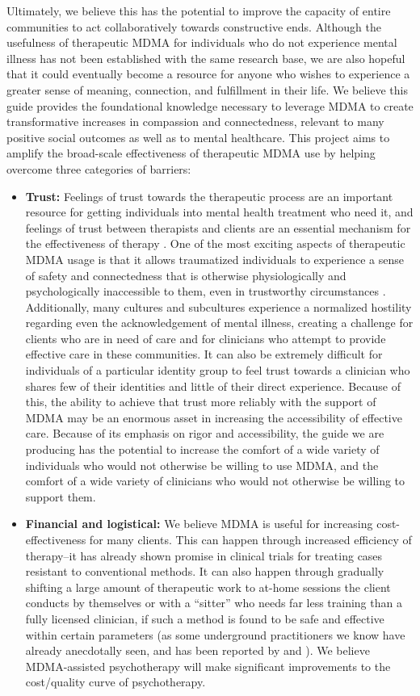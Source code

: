 \documentclass[12pt,letterpaper]{book}
\begin{document}
Ultimately, we believe this has the potential to improve the capacity of entire communities to act collaboratively towards constructive ends. Although the usefulness of therapeutic MDMA for individuals who do not experience mental illness has not been established with the same research base, we are also hopeful that it could eventually become a resource for anyone who wishes to experience a greater sense of meaning, connection, and fulfillment in their life. We believe this guide provides the foundational knowledge necessary to leverage MDMA to create transformative increases in compassion and connectedness, relevant to many positive social outcomes as well as to mental healthcare. This project aims to amplify the broad-scale effectiveness of therapeutic MDMA use by helping overcome three categories of barriers:
\begin{itemize}
    \item \textbf{Trust:} Feelings of trust towards the therapeutic process are an important resource for getting individuals into mental health treatment who need it, and feelings of trust between therapists and clients are an essential mechanism for the effectiveness of therapy \cite{wampoldCommonFactors}. One of the most exciting aspects of therapeutic MDMA usage is that it allows traumatized individuals to experience a sense of safety and connectedness that is otherwise physiologically and psychologically inaccessible to them, even in trustworthy circumstances \cite{fedduciaMDMAMemoryReconsolidation}. Additionally, many cultures and subcultures experience a normalized hostility regarding even the acknowledgement of mental illness, creating a challenge for clients who are in need of care and for clinicians who attempt to provide effective care in these communities. It can also be extremely difficult for individuals of a particular identity group to feel trust towards a clinician who shares few of their identities and little of their direct experience. Because of this, the ability to achieve that trust more reliably with the support of MDMA may be an enormous asset in increasing the accessibility of effective care. Because of its emphasis on rigor and accessibility, the guide we are producing has the potential to increase the comfort of a wide variety of individuals who would not otherwise be willing to use MDMA, and the comfort of a wide variety of clinicians who would not otherwise be willing to support them.
    \item \textbf{Financial and logistical:} We believe MDMA is useful for increasing cost-effectiveness for many clients. This can happen through increased efficiency of therapy–it has already shown promise in clinical trials for treating cases resistant to conventional methods. It can also happen through gradually shifting a large amount of therapeutic work to at-home sessions the client conducts by themselves or with a “sitter” who needs far less training than a fully licensed clinician, if such a method is found to be safe and effective within certain parameters (as some underground practitioners we know have already anecdotally seen, and has been reported by \textcite{colbertEvenings} and \textcite{hillsSolo}). We believe MDMA-assisted psychotherapy will make significant improvements to the cost/quality curve of psychotherapy.

\end{itemize}
\end{document}
